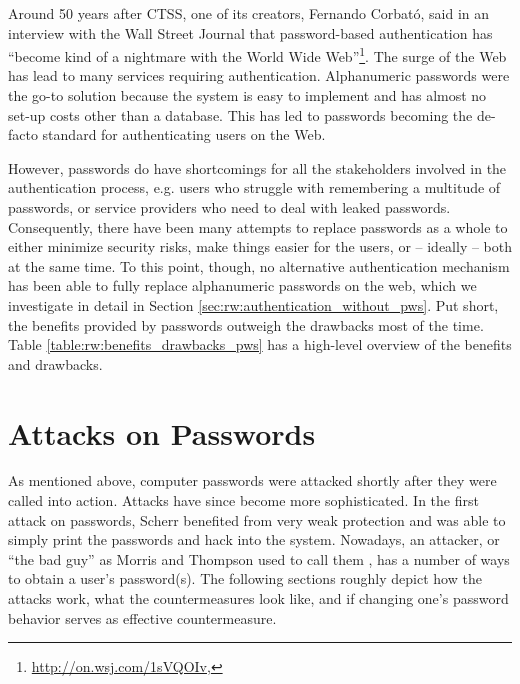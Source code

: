 


Around 50 years after CTSS, one of its creators, Fernando Corbató, said in an interview with the Wall Street Journal that password-based authentication has ``become kind of a nightmare with the World Wide Web''\footnote{\label{foot:corbato_regrets}\url{http://on.wsj.com/1sVQOIv}, }. The surge of the Web has lead to many services requiring authentication. Alphanumeric passwords were the go-to solution because the system is easy to implement and has almost no set-up costs other than a database. This has led to passwords becoming the de-facto standard for authenticating users on the Web.

However, passwords do have shortcomings for all the stakeholders involved in the authentication process, e.g. users who struggle with remembering a multitude of passwords, or service providers who need to deal with leaked passwords. Consequently, there have been many attempts to replace passwords as a whole to either minimize security risks, make things easier for the users, or -- ideally -- both at the same time. To this point, though, no alternative authentication mechanism has been able to fully replace alphanumeric passwords on the web, which we investigate in detail in Section \ref{sec:rw:authentication_without_pws}. Put short, the benefits provided by passwords outweigh the drawbacks most of the time. Table \ref{table:rw:benefits_drawbacks_pws} has a high-level overview of the benefits and drawbacks.




\section{Attacks on Passwords}\label{sec:rw:attack_vectors}
As mentioned above, computer passwords were attacked shortly after they were called into action. Attacks have since become more sophisticated. In the first attack on passwords, Scherr benefited from very weak protection and was able to simply print the passwords and hack into the system. Nowadays, an attacker, or ``the bad guy'' as Morris and Thompson used to call them \cite{Morris1979PasswordSecurity}, has a number of ways to obtain a user's password(s). The following sections roughly depict how the attacks work, what the countermeasures look like, and if changing one's password behavior serves as effective countermeasure. 


